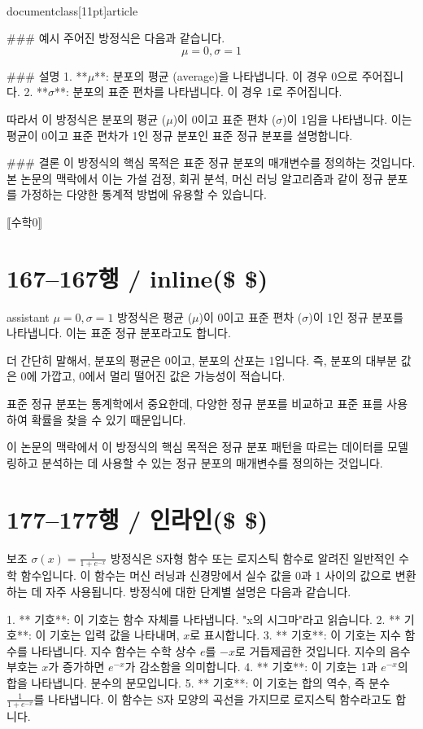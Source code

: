 \\documentclass[11pt]{article}
\begin{document}
### 예시
주어진 방정식은 다음과 같습니다.
\[
\mu = 0, \sigma = 1
\]

### 설명
1. **\(\mu\)**: 분포의 평균 (average)을 나타냅니다. 이 경우 0으로 주어집니다.
2. **\(\sigma\)**: 분포의 표준 편차를 나타냅니다. 이 경우 1로 주어집니다.

따라서 이 방정식은 분포의 평균 (\(\mu\))이 0이고 표준 편차 (\(\sigma\))이 1임을 나타냅니다. 이는 평균이 0이고 표준 편차가 1인 정규 분포인 표준 정규 분포를 설명합니다.

### 결론
이 방정식의 핵심 목적은 표준 정규 분포의 매개변수를 정의하는 것입니다. 본 논문의 맥락에서 이는 가설 검정, 회귀 분석, 머신 러닝 알고리즘과 같이 정규 분포를 가정하는 다양한 통계적 방법에 유용할 수 있습니다.

⟦수학0⟧

\section*{167–167행 / inline(\$ \$) }
assistant
\(\mu=0,\sigma=1\) 방정식은 평균 (\(\mu\))이 0이고 표준 편차 (\(\sigma\))이 1인 정규 분포를 나타냅니다. 이는 표준 정규 분포라고도 합니다.

더 간단히 말해서, 분포의 평균은 0이고, 분포의 산포는 1입니다. 즉, 분포의 대부분 값은 0에 가깝고, 0에서 멀리 떨어진 값은 가능성이 적습니다.

표준 정규 분포는 통계학에서 중요한데, 다양한 정규 분포를 비교하고 표준 표를 사용하여 확률을 찾을 수 있기 때문입니다.

이 논문의 맥락에서 이 방정식의 핵심 목적은 정규 분포 패턴을 따르는 데이터를 모델링하고 분석하는 데 사용할 수 있는 정규 분포의 매개변수를 정의하는 것입니다.

\section*{177–177행 / 인라인(\$ \$)}
보조
\(\sigma(x) = \frac{1}{1 + e^{-x}}\) 방정식은 S자형 함수 또는 로지스틱 함수로 알려진 일반적인 수학 함수입니다. 이 함수는 머신 러닝과 신경망에서 실수 값을 0과 1 사이의 값으로 변환하는 데 자주 사용됩니다. 방정식에 대한 단계별 설명은 다음과 같습니다.

1. ** 기호**: 이 기호는 함수 자체를 나타냅니다. "x의 시그마"라고 읽습니다.
2. ** 기호**: 이 기호는 입력 값을 나타내며, \(x\)로 표시합니다.
3. ** 기호**: 이 기호는 지수 함수를 나타냅니다. 지수 함수는 수학 상수 \(e\)를 \(-x\)로 거듭제곱한 것입니다. 지수의 음수 부호는 \(x\)가 증가하면 \(e^{-x}\)가 감소함을 의미합니다.
4. ** 기호**: 이 기호는 1과 \(e^{-x}\)의 합을 나타냅니다. 분수의 분모입니다.
5. ** 기호**: 이 기호는 합의 역수, 즉 분수 \(\frac{1}{1 + e^{-x}}\)를 나타냅니다. 이 함수는 S자 모양의 곡선을 가지므로 로지스틱 함수라고도 합니다.
\end{document}
